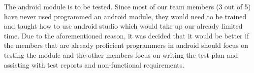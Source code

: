 The android module is to be tested. Since most of our team members (3 out of 5) have never used programmed an android module, they would need to be trained and taught how to use android studio which would take up our already limited time. Due to the aforementioned reason, it was decided that it would be better if the members that are already proficient programmers in android should focus on testing the module and the other members focus on writing the test plan and assisting with test reports and non-functional requirements.